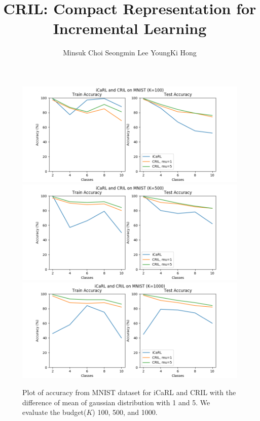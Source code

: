 \documentclass[prodmode,acmtecs]{acmsmall} %
\begin{document}
\title{CRIL: Compact Representation for Incremental Learning}
\author{Minsuk Choi
Seongmin Lee
YoungKi Hong
}

% 

\maketitle









\clearpage
\begin{figure}[hbtp]
\includegraphics[width=120mm]{data/figures/MNIST_K-100.png}
\centering
\includegraphics[width=120mm]{data/figures/MNIST_K-500.png}
\centering
\includegraphics[width=120mm]{data/figures/MNIST_K-1000.png}
\centering
\caption{Plot of accuracy from MNIST dataset for iCaRL and CRIL with the difference of mean of gaussian distribution with 1 and 5. We evaluate the budget($K$) 100, 500, and 1000. \label{fig:mnist}}
\end{figure}
\end{document}
